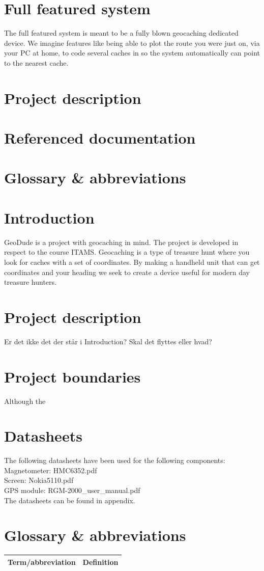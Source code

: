 \section{Full featured system}

The full featured system is meant to be a fully blown geocaching dedicated device. We imagine features like being able to plot the route you were just on, via your PC at home, to code several caches in so the system automatically can point to the nearest cache. 



\section{Project description}

\section{Referenced documentation}

\section{Glossary \& abbreviations}

\section{Introduction}
GeoDude is a project with geocaching in mind. The project is developed in respect to the course ITAMS. Geocaching is a type of treasure hunt where you look for caches with a set of coordinates. By making a handheld unit that can get coordinates and your heading we seek to create a device useful for modern day treasure hunters. 

\section{Project description}
Er det ikke det der står i Introduction? Skal det flyttes eller hvad?

\section{Project boundaries}
Although the 

\section{Datasheets}
The following datasheets have been used for the following components:\\
Magnetometer: HMC6352.pdf\\
Screen: Nokia5110.pdf\\
GPS module: RGM-2000\_user\_manual.pdf\\

The datasheets can be found in appendix.

\section{Glossary \& abbreviations}
\begin{table}[H]
\centering
\begin{tabular}{|p{4cm}|p{7cm}|}
\hline
Term/abbreviation & Definition\\ \hline
\end{tabular}
\end{table}


